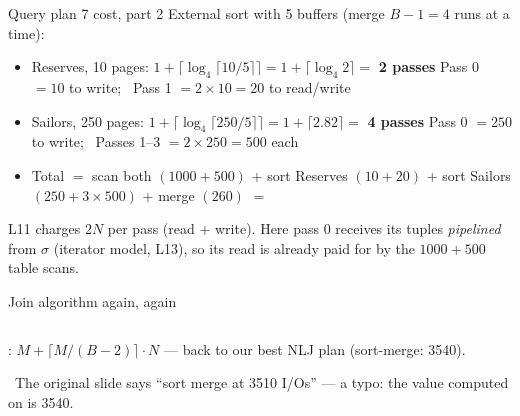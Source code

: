 \begin{frame}{Query plan 7 cost, part 2 }
  \small
  External sort with 5 buffers (merge $B-1 = 4$ runs at a time):
  \begin{itemize}
    \item Reserves, 10 pages: $1 + \lceil \log_4 \lceil 10/5 \rceil \rceil = 1 + \lceil \log_4 2 \rceil =$ \textbf{2 passes}
          \quad Pass 0 $= 10$ to write; \ Pass 1 $= 2 \times 10 = 20$ to read/write
    \item Sailors, 250 pages: $1 + \lceil \log_4 \lceil 250/5 \rceil \rceil = 1 + \lceil 2.82 \rceil =$ \textbf{4 passes}
          \quad Pass 0 $= 250$ to write; \ Passes 1--3 $= 2 \times 250 = 500$ each
    \item Total $=$ scan both $(1000 + 500)$ + sort Reserves $(10 + 20)$
          + sort Sailors $(250 + 3 \times 500)$ + merge $(260)$ $=$ 
  \end{itemize}
  \begin{extrabox}
    L11 charges $2N$ per pass (read + write). Here pass 0 receives its tuples \emph{pipelined} from $\sigma$
    (iterator model, L13), so its read is already paid for by the $1000 + 500$ table scans.
  \end{extrabox}
\end{frame}



\begin{frame}{Join algorithm again, again }
  \begin{columns}[T]
      \planbox[small]{37mm}{\PlanSix}\centering{}
      \centering\vspace*{20mm}{\color{vinuRed}\Large\faArrowRight}
      \planbox[small,hl]{37mm}{\PlanEight}\centering{}
  \end{columns}
  \vspace{1mm}
  \begin{itemize}\footnotesize
    : $M + \lceil M/(B-2) \rceil \cdot N$ --- back to our best NLJ plan (sort-merge: 3540).
  \end{itemize}
  {\scriptsize\color{vinuRed}\faExclamationTriangle\ The original slide says ``sort merge at 3510 I/Os'' --- a typo: the value computed on  is 3540.}
\end{frame}

